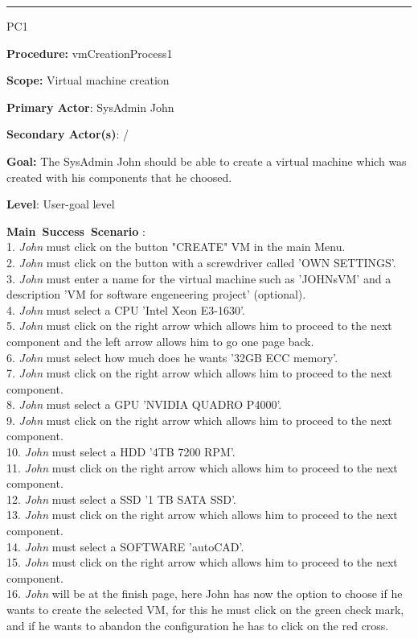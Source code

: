 \hrule
\vspace{0.5cm}
\begin{lyxlist}{PC1}
\small{
\item [\textbf{Procedure:}] vmCreationProcess1
\item [\textbf{Scope:}] Virtual machine creation
\item [\textbf{Primary Actor}:] SysAdmin John
\item [\textbf{Secondary Actor(s)}:] /
\item [\textbf{Goal:}] The SysAdmin John should be able to create a virtual
machine which was created with his components that he choosed.
\item [\textbf{Level}:] User-goal level
\item [\textbf{Main~Success~Scenario}]:\\

1. \emph{John} must click on the button "CREATE" VM in the main Menu.\\
2. \emph{John} must click on the button with a screwdriver called 'OWN
SETTINGS'.\\
3. \emph{John} must enter a name for the virtual machine such as 'JOHNsVM'
and a description 'VM for software engeneering project' (optional).\\
4. \emph{John} must select a CPU 'Intel Xeon E3-1630'.\\
5. \emph{John} must click on the right arrow which allows him to
proceed to the next component and the left arrow allows him to go one page
back.\\
6. \emph{John} must select how much does he wants '32GB ECC memory'.\\
7. \emph{John} must click on the right arrow which allows him to
proceed to the next component.\\
8. \emph{John} must select a GPU 'NVIDIA QUADRO P4000'.\\
9. \emph{John} must click on the right arrow which allows him to
proceed to the next component.\\
10. \emph{John} must select a HDD '4TB 7200 RPM'.\\
11. \emph{John} must click on the right arrow which allows him to
proceed to the next component.\\
12. \emph{John} must select a SSD '1 TB SATA SSD'.\\
13. \emph{John} must click on the right arrow which allows him to
proceed to the next component.\\
14. \emph{John} must select a SOFTWARE 'autoCAD'.\\
15. \emph{John} must click on the right arrow which allows him to
proceed to the next component.\\
16. \emph{John} will be at the finish page, here John has now the option to
choose if he wants to create the selected VM, for this he must click on the
green check mark, and if he wants to abandon the configuration he has to
click on the red cross.\\


}
\end{lyxlist}
